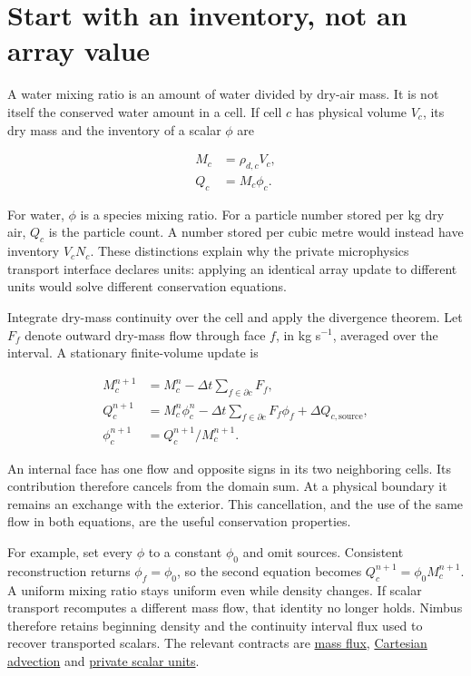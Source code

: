 \documentclass[
  11pt,
]{report}
\begin{document}
\section{Start with an inventory, not an array
value}\label{start-with-an-inventory-not-an-array-value}

A water mixing ratio is an amount of water divided by dry-air mass. It
is not itself the conserved water amount in a cell. If cell \(c\) has
physical volume \(V_c\), its dry mass and the inventory of a scalar
\(\phi\) are

\[\begin{aligned}
M_c &= \rho_{d,c} V_c, \\
Q_c &= M_c\phi_c.
\end{aligned}\]

For water, \(\phi\) is a species mixing ratio. For a particle number
stored per kg dry air, \(Q_c\) is the particle count. A number stored
per cubic metre would instead have inventory \(V_c N_c\). These
distinctions explain why the private microphysics transport interface
declares units: applying an identical array update to different units
would solve different conservation equations.

Integrate dry-mass continuity over the cell and apply the divergence
theorem. Let \(F_f\) denote outward dry-mass flow through face \(f\), in
kg s\(^{-1}\), averaged over the interval. A stationary finite-volume
update is

\[\begin{aligned}
M_c^{n+1} &= M_c^n-\Delta t\sum_{f\in\partial c}F_f, \\
Q_c^{n+1} &= M_c^n\phi_c^n
             -\Delta t\sum_{f\in\partial c}F_f\phi_f
             +\Delta Q_{c,\mathrm{source}}, \\
\phi_c^{n+1} &= Q_c^{n+1}/M_c^{n+1}.
\end{aligned}\]

An internal face has one flow and opposite signs in its two neighboring
cells. Its contribution therefore cancels from the domain sum. At a
physical boundary it remains an exchange with the exterior. This
cancellation, and the use of the same flow in both equations, are the
useful conservation properties.

For example, set every \(\phi\) to a constant \(\phi_0\) and omit
sources. Consistent reconstruction returns \(\phi_f=\phi_0\), so the
second equation becomes \(Q_c^{n+1}=\phi_0 M_c^{n+1}\). A uniform mixing
ratio stays uniform even while density changes. If scalar transport
recomputes a different mass flow, that identity no longer holds. Nimbus
therefore retains beginning density and the continuity interval flux
used to recover transported scalars. The relevant contracts are
\href{../include/numerics/advection/cartesian_mass_flux.hpp}{mass flux},
\href{../src/numerics/advection/advection_cartesian.cpp}{Cartesian
advection} and
\href{../include/microphysics/prognostic_transport.hpp}{private scalar
units}.
\end{document}
